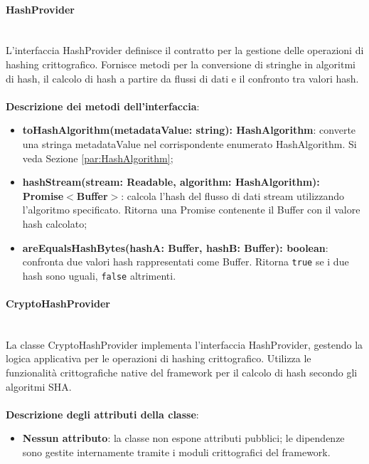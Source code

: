 \documentclass[a4paper,12pt]{article}
\begin{document}
{{{                \paragraph{HashProvider}\label{par:HashProvider}\mbox{}\\
                L'interfaccia HashProvider definisce il contratto per la gestione delle operazioni di hashing crittografico. Fornisce metodi per la conversione di stringhe in algoritmi di hash, il calcolo di hash a partire da flussi di dati e il confronto tra valori hash.\\
                \\
                \noindent \textbf{Descrizione dei metodi dell'interfaccia}:
                \begin{itemize}
                    \item \textbf{toHashAlgorithm(metadataValue: string): HashAlgorithm}: converte una stringa metadataValue nel corrispondente enumerato HashAlgorithm. Si veda Sezione \ref{par:HashAlgorithm};
                    \item \textbf{hashStream(stream: Readable, algorithm: HashAlgorithm):\\ Promise$<$Buffer$>$}: calcola l'hash del flusso di dati stream utilizzando l'algoritmo specificato. Ritorna una Promise contenente il Buffer con il valore hash calcolato;
                    \item \textbf{areEqualsHashBytes(hashA: Buffer, hashB: Buffer): boolean}: confronta due valori hash rappresentati come Buffer. Ritorna \texttt{true} se i due hash sono uguali, \texttt{false} altrimenti.
                \end{itemize}
                \paragraph{CryptoHashProvider}\label{par:CryptoHashProvider}\mbox{}\\
                La classe CryptoHashProvider implementa l'interfaccia HashProvider, gestendo la logica applicativa per le operazioni di hashing crittografico. Utilizza le funzionalità crittografiche native del framework per il calcolo di hash secondo gli algoritmi SHA.\\
                \\
                \textbf{Descrizione degli attributi della classe}:
                \begin{itemize}
                    \item \textbf{Nessun attributo}: la classe non espone attributi pubblici; le dipendenze sono gestite internamente tramite i moduli crittografici del framework.
                \end{itemize}
                
}}}
\end{document}
